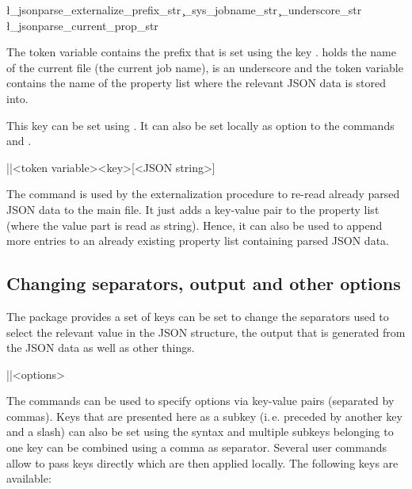 \documentclass[a4paper]{article}
\begin{document}
{{\begin{codeexample}
\l_jsonparse_externalize_prefix_str \c_sys_jobname_str 
    \c_underscore_str \l_jsonparse_current_prop_str
\end{codeexample}

The token variable  contains the prefix that is set using the key .  holds the name of the current file (the current job name),  is an underscore and the token variable  contains the name of the property list where the relevant JSON data is stored into.

This key can be set using \macro{\JSONParseSet}. It can also be set locally as option to the commands \macro{\JSONParse} and \macro{\JSONParseFromFile}.

\begin{macrodef}
|\JSONParsePut|{<token variable>}{<key>}[<JSON string>]
\end{macrodef}
The command \macro{\JSONParsePut} is used by the externalization procedure to re-read already parsed JSON data to the main file. It just adds a key-value pair to the property list (where the value part is read as string). Hence, it can also be used to append more entries to an already existing property list containing parsed JSON data.

\subsection{Changing separators, output and other options}\label{sec:options}

The package provides a set of keys can be set to change the separators used to select the relevant value in the JSON structure, the output that is generated from the JSON data as well as other things.

\begin{macrodef}
|\JSONParseSet|{<options>}
\end{macrodef}
The commands \macro{\JSONParseSet} can be used to specify options via key-value pairs (separated by commas). Keys that are presented here as a subkey (i.\,e. preceded by another key and a slash) can also be set using the syntax  and multiple subkeys belonging to one key can be combined using a comma as separator. Several user commands allow to pass keys directly which are then applied locally. The following keys are available:

}}
\end{document}
